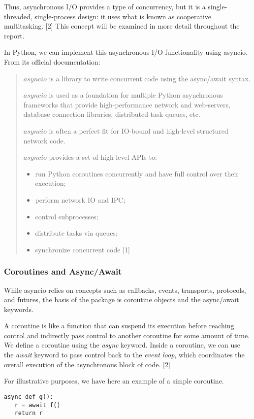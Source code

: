 Thus, asynchronous I/O provides  a type of concurrency, but it is a single-threaded, single-process design: it uses what is known as cooperative multitasking.  [2]  This concept will be
examined in more detail throughout the report. 

In Python, we can implement this asynchronous I/O functionality using asyncio. From its official documentation: 
\begin{quote}
$asyncio$ is a library to write concurrent code using the async/await syntax.

$asyncio$ is used as a foundation for multiple Python asynchronous frameworks that provide high-performance network and web-servers, database connection libraries, distributed task queues, etc.

$asyncio$ is often a perfect fit for IO-bound and high-level structured network code.

$asyncio$ provides a set of high-level APIs to:
\begin{itemize} 
\item run Python coroutines concurrently and have full control over their execution;
\item perform network IO and IPC;
\item control subprocesses;
\item distribute tasks via queues;
\item synchronize concurrent code [1]
\end{itemize}
\end{quote}

\subsubsection{Coroutines and Async/Await} 
While asyncio relies on concepts such as callbacks, events, transports, protocols, and futures, 
the basis of the package is coroutine objects and the async/await keywords. 

A coroutine is like a function that can suspend its execution before reaching control and indirectly pass control to another coroutine for some amount of time. We define
a coroutine using the \emph{async} keyword. Inside a coroutine, we can use the \emph{await} keyword to pass control back to the \emph{event loop}, which coordinates the 
overall execution of the asynchronous block of code. [2]

For illustrative purposes, we have here an example of a simple coroutine. 
\begin{verbatim}
async def g():
   r = await f()
   return r
\end{verbatim}

